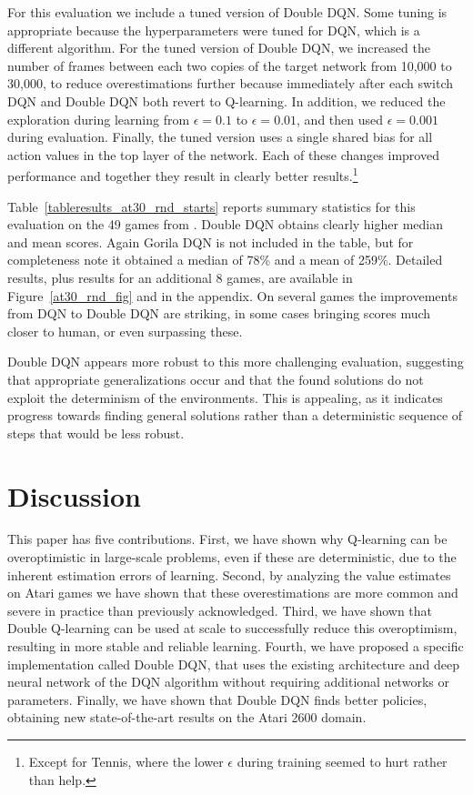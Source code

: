 \documentclass[letterpaper]{article}
\begin{document}
For this evaluation we include a tuned version of Double DQN.  Some tuning is appropriate because the hyperparameters were tuned for DQN, which is a different algorithm.  For the tuned version of Double DQN, we increased the number of frames between each two copies of the target network from 10,000 to 30,000, to reduce overestimations further because immediately after each switch DQN and Double DQN both revert to Q-learning.  In addition, we reduced the exploration during learning from $\epsilon=0.1$ to $\epsilon=0.01$, and then used $\epsilon=0.001$ during evaluation.  Finally, the tuned version uses a single shared bias for all action values in the top layer of the network.  Each of these changes improved performance and together they result in clearly better results.\footnote{Except for Tennis, where the lower $\epsilon$ during training seemed to hurt rather than help.}

Table~\ref{tableresults_at30_rnd_starts} reports summary statistics for this evaluation on the 49 games from \citet{Mnih:2015}.  Double DQN obtains clearly higher median and mean scores.  Again Gorila DQN \citep{Nair:2015} is not included in the table, but for completeness note it obtained a median of 78\% and a mean of 259\%. 
Detailed results, plus results for an additional 8 games, are available in Figure~\ref{at30_rnd_fig} and in the appendix. On several games the improvements from DQN to Double DQN are striking, in some cases bringing scores much closer to human, or even surpassing these.


Double DQN appears more robust to this more challenging evaluation,
suggesting that appropriate generalizations occur and that the found solutions do not exploit the determinism of the environments.
This is appealing, as it indicates progress towards finding general solutions rather than a deterministic sequence of steps that would be less robust.

\section{Discussion}

This paper has five contributions.  First, we have shown why Q-learning can be overoptimistic in large-scale problems, even if these are deterministic, due to the inherent estimation errors of learning.  Second, by analyzing the value estimates on Atari games we have shown that these overestimations are more common and severe in practice than previously acknowledged.
Third, we have shown that Double Q-learning can be used at scale to successfully reduce this overoptimism, resulting in more stable and reliable learning.  Fourth, we have proposed a specific implementation called Double DQN, that uses the existing architecture and deep neural network of the DQN algorithm without requiring additional networks or parameters.  Finally, we have shown that Double DQN finds better policies, obtaining new state-of-the-art results on the Atari 2600 domain.
\end{document}
